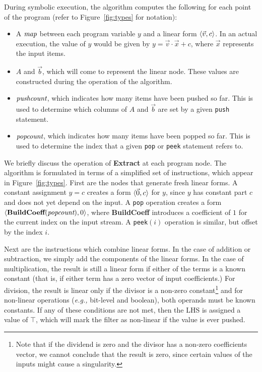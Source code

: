 During symbolic execution, the algorithm computes the following for
each point of the program (refer to Figure~\ref{fig:types} for
notation):
\begin{itemize}

\item A $\mbox{\it map}$ between each program variable $y$ and a linear form
$\langle{{\vec v}}, {c}\rangle$.  In an actual execution, the value of $y$ would
be given by $y = {\vec v} \cdot {\vec x} + c$, where ${\vec x}$
represents the input items.

\item $A$ and $\vec b$, which will come to represent the linear node.
These values are constructed during the operation of the algorithm.

\item $\mbox{\it pushcount}$, which indicates how many items have been
pushed so far.  This is used to determine which columns of $A$ and
$\vec b$ are set by a given {\tt push} statement.

\item $\mbox{\it popcount}$, which indicates how many items have been popped
so far.  This is used to determine the index that a given {\tt pop} or
{\tt peek} statement refers to.

\end{itemize}

We briefly discuss the operation of {\bf Extract} at each program
node.  The algorithm is formulated in terms of a simplified set of
instructions, which appear in Figure~\ref{fig:types}.  First are the
nodes that generate fresh linear forms.  A constant assignment $y = c$
creates a form $\langle{\vec 0}, {c}\rangle$ for $y$, since $y$ has constant part
$c$ and does not yet depend on the input.  A {\tt pop} operation
creates a form $\langle{\mbox{\bf BuildCoeff}(\mbox{\it popcount})}, {0}\rangle$, where
{\bf BuildCoeff} introduces a coefficient of $1$ for the current index
on the input stream.  A {\tt peek}$(i)$ operation is similar, but
offset by the index $i$.

Next are the instructions which combine linear forms.  In the case of
addition or subtraction, we simply add the components of the linear
forms.  In the case of multiplication, the result is still a linear
form if either of the terms is a known constant (that is, if either
term has a zero vector of input coefficients.)  For division, the
result is linear only if the divisor is a non-zero
constant\footnote{Note that if the dividend is zero and the divisor
has a non-zero coefficients vector, we cannot conclude that the result
is zero, since certain values of the inputs might cause a
singularity.} and for non-linear operations ({\it e.g.,} bit-level and
boolean), both operands must be known constants.  If any of these
conditions are not met, then the LHS is assigned a value of $\top$,
which will mark the filter as non-linear if the value is ever pushed.

